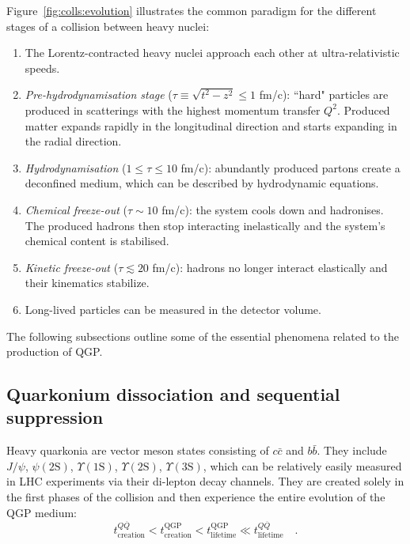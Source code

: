 Figure~\ref{fig:colls:evolution} illustrates the common paradigm for the different stages of a collision between heavy nuclei:
\begin{enumerate}
\item The Lorentz-contracted heavy nuclei approach each other at ultra-relativistic speeds.
\item \textit{Pre-hydrodynamisation stage} ($\tau \equiv \sqrt{t^2 - z^2} \leq 1$ fm/c): ``hard" particles are produced in scatterings with the highest momentum transfer $Q^2$. Produced matter expands rapidly in the longitudinal direction and starts expanding in the radial direction.
\item \textit{Hydrodynamisation} ($1 \leq \tau \leq 10$ fm/c): abundantly produced partons create a deconfined medium, which can be described by hydrodynamic equations.
\item \textit{Chemical freeze-out} ($\tau \sim 10$ fm/c): the system cools down and hadronises. The produced hadrons then stop interacting inelastically and the system's chemical content is stabilised.
\item \textit{Kinetic freeze-out} ($\tau \lesssim 20$ fm/c): hadrons no longer interact elastically and their kinematics stabilize.
\item Long-lived particles can be measured in the detector volume. 
\end{enumerate}

The following subsections outline some of the essential phenomena related to the production of QGP.

\subsection{Quarkonium dissociation and sequential suppression}

Heavy quarkonia are vector meson states consisting of $c\bar{c}$ and $b\bar{b}$. They include $J/\psi$, $\psi(2\mathrm{S})$, $\Upsilon(1\mathrm{S})$, $\Upsilon(2\mathrm{S})$, $\Upsilon(3\mathrm{S})$, which can be relatively easily measured in LHC experiments via their di-lepton decay channels. They are created solely in the first phases of the collision and then experience the entire evolution of the QGP medium:
\begin{equation}
t^{Q\overline{Q}}_\mathrm{creation} < t^\mathrm{QGP}_\mathrm{creation} < t^\mathrm{QGP}_\mathrm{lifetime} \ll t^{Q\overline{Q}}_\mathrm{lifetime} \quad .
\end{equation}

